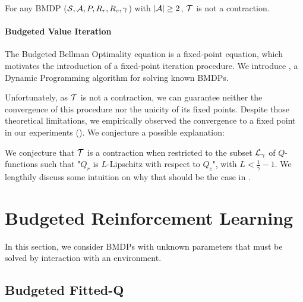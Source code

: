 \documentclass{article}
\begin{document}
\begin{theorem}[Contractivity of $\cT$]
\label{thm:contraction}
For any BMDP ($\mathcal{S},\mathcal{A},P,R_r,R_c,\gamma$) with $|\mathcal{A}| \geq 2$, $\cT$ is not a contraction.
\end{theorem}

\paragraph{Budgeted Value Iteration}

The Budgeted Bellman Optimality equation is a fixed-point equation, which motivates the introduction of a fixed-point iteration procedure. We introduce , a Dynamic Programming algorithm for solving known BMDPs.

Unfortunately, as $\cT$ is not a contraction, we can guarantee neither the convergence of this procedure nor the unicity of its fixed points. Despite those theoretical limitations, we empirically observed the convergence to a fixed point in our experiments (). We conjecture a possible explanation:

\begin{remark}
\label{rmk:contractivity-smooth}
We conjecture that $\cT$ is a contraction when restricted to the subset $\mathcal{L}_\gamma$ of $Q$-functions such that "$Q_r$ is $L$-Lipschitz with respect to $Q_c$", with $L<\frac{1}{\gamma}-1$. We lengthily discuss some intuition on why that should be the case in .
\end{remark}





\section{Budgeted Reinforcement Learning}
\label{sec:brl}

In this section, we consider BMDPs with unknown parameters that must be solved by interaction with an environment. 

\subsection{Budgeted Fitted-Q}
\label{subsec:bftq}
\end{document}
